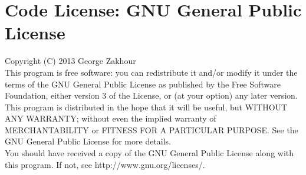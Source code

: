 \documentclass[a4paper, 10pt]{article}
\begin{document}
\newpage
\section{Code License: GNU General Public License}
Copyright (C) 2013 George Zakhour\\

This program is free software: you can redistribute it and/or modify it under
the terms of the GNU General Public License as published by the Free Software
Foundation, either version 3 of the License, or (at your option) any later
version.\\

This program is distributed in the hope that it will be useful, but WITHOUT ANY
WARRANTY; without even the implied warranty of MERCHANTABILITY or FITNESS FOR A
PARTICULAR PURPOSE. See the GNU General Public License for more details.\\

You should have received a copy of the GNU General Public License along with
this program. If not, see http://www.gnu.org/licenses/.\\
\end{document}

